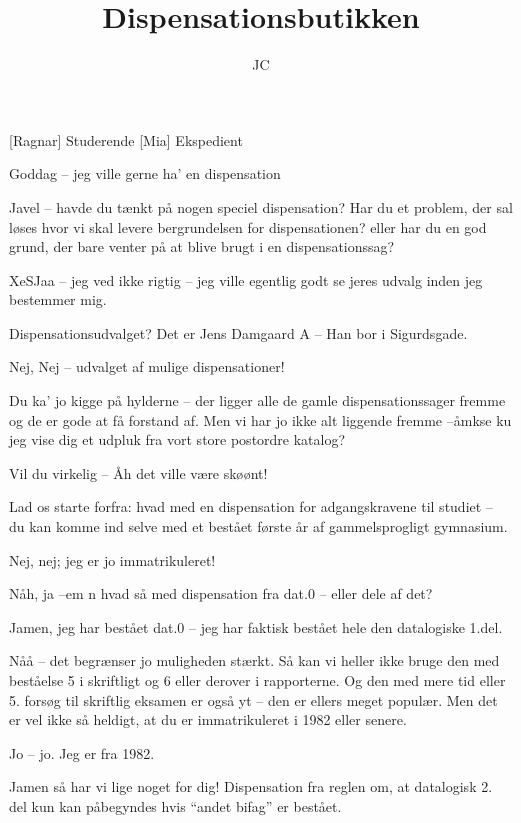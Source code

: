 \documentclass[a4paper,11pt]{article}
\title{Dispensationsbutikken}
\author{JC}
\begin{document}
\maketitle

\begin{roles}
[Ragnar] Studerende
[Mia] Ekspedient
\end{roles}

\begin{sketch}
 Goddag -- jeg ville gerne ha' en dispensation

 Javel -- havde du tænkt på nogen speciel dispensation? Har du et
problem, der sal løses hvor vi skal levere bergrundelsen for dispensationen?
eller har du en god grund, der bare venter på at blive brugt i en
dispensationssag?

XeSJaa -- jeg ved ikke rigtig -- jeg ville egentlig godt se jeres udvalg inden
jeg bestemmer mig.

 Dispensationsudvalget? Det er Jens Damgaard A -- Han bor i Sigurdsgade.

 Nej, Nej -- udvalget af mulige dispensationer!

 Du ka' jo kigge på hylderne -- der ligger alle de gamle
dispensationssager fremme og de er gode at få forstand af.  Men vi har jo ikke
alt liggende fremme --åmkse ku jeg vise dig et udpluk fra vort store postordre
katalog?

 Vil du virkelig -- Åh det ville være skøønt!

 Lad os starte forfra: hvad med en dispensation for adgangskravene til
studiet -- du kan komme ind selve med et bestået første år af gammelsprogligt
gymnasium.

 Nej, nej; jeg er jo immatrikuleret!

 Nåh, ja --em n hvad så med dispensation fra dat.0 -- eller dele af det?

 Jamen, jeg har bestået dat.0 -- jeg har faktisk bestået hele den
datalogiske 1.del.

 Nåå -- det begrænser jo muligheden stærkt. Så kan vi heller ikke bruge
den med beståelse 5 i skriftligt og 6 eller derover i rapporterne. Og den med
mere tid eller 5. forsøg til skriftlig eksamen er også yt -- den er ellers meget
populær.  Men det er vel ikke så heldigt, at du er immatrikuleret i 1982 eller
senere.

 Jo -- jo. Jeg er fra 1982.

 Jamen så har vi lige noget for dig! Dispensation fra reglen om, at
datalogisk 2. del kun kan påbegyndes hvis ``andet bifag'' er bestået.


\end{sketch}
\end{document}
